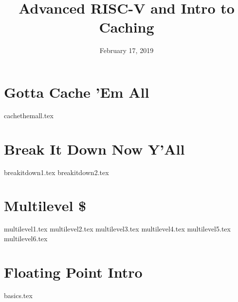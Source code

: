 \documentclass[11pt]{exam}
\title{Advanced RISC-V and Intro to Caching}
\date{February 17, 2019}
\begin{document}
\maketitle

\section{Gotta Cache 'Em All}
\begin{questions}
{cachethemall.tex}
\end{questions}
\newpage

\section{Break It Down Now Y'All}
\begin{questions}
{breakitdown1.tex}
{breakitdown2.tex}
\end{questions}
\newpage

\section{Multilevel \$}
\begin{questions}
{multilevel1.tex}
{multilevel2.tex}
{multilevel3.tex}
{multilevel4.tex}
{multilevel5.tex}
{multilevel6.tex}
\end{questions}
\newpage

\section{Floating Point Intro}
\begin{questions}
{basics.tex}
\end{questions}
\newpage
\end{document}
